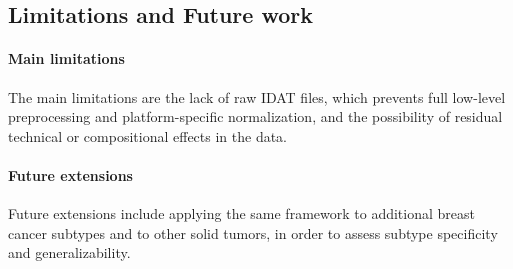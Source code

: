 \documentclass[10pt]{extarticle}
\begin{document}
\subsection{Limitations and Future work}
\paragraph{Main limitations}
The main limitations are the lack of raw IDAT files, which prevents full low-level preprocessing and platform-specific normalization, and the possibility of residual technical or compositional effects in the data.
\paragraph{Future extensions}
Future extensions include applying the same framework to additional breast cancer subtypes and to other solid tumors, in order to assess subtype specificity and generalizability.
\end{document}
